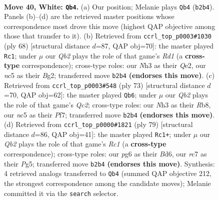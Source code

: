 \documentclass[11pt]{article}
\begin{document}
\clearpage

\begin{figure}[p]\centering
\begin{subfigure}{0.46\textwidth}\centering
\resizebox{\linewidth}{!}{%
\newchessgame
\chessboard[
  setfen={2b3k1/1qr2p1p/6p1/1Bn1Pp2/p4P2/7N/PQP2KPP/1R6 w - - 16 40},
  showmover=false,
  pgfstyle=straightmove, color=movearrow, markmove={b2-b4}
]}
\caption{}
\end{subfigure}\hfill
\begin{subfigure}{0.46\textwidth}\centering
\resizebox{\linewidth}{!}{%
\newchessgame
\chessboard[
  setfen={3q2k1/1p3ppb/p1pr3p/4n2P/1P1N4/P3P1P1/4QPB1/3R2K1 w - - 5 35},
  showmover=false,
  pgfstyle=straightmove, color=movearrow, markmove={d1-c1}
]}
\caption{}
\end{subfigure}
\\[4pt]
\begin{subfigure}{0.46\textwidth}\centering
\resizebox{\linewidth}{!}{%
\newchessgame
\chessboard[
  setfen={1r4k1/2q2p2/3p1npb/p2Pp3/Q3P2B/2P4P/R3NPPK/8 b - - 0 37},
  showmover=false,
  pgfstyle=straightmove, color=movearrow, markmove={c7-b6}
]}
\caption{}
\end{subfigure}\hfill
\begin{subfigure}{0.46\textwidth}\centering
\resizebox{\linewidth}{!}{%
\newchessgame
\chessboard[
  setfen={2r1b2k/8/1p1bpq2/5pp1/p2N4/P3P1P1/1P1RQPB1/6K1 b - - 0 40},
  showmover=false,
  pgfstyle=straightmove, color=movearrow, markmove={c8-c1}
]}
\caption{}
\end{subfigure}
\caption{\textbf{Move 40, White: \texttt{Qb4}.} (a) Our position; Melanie plays \texttt{Qb4} (\texttt{b2b4}). Panels (b)--(d) are the retrieved master positions whose correspondence most drove this move (highest QAP objective among those that transfer to it). (b) Retrieved from \texttt{ccrl\_top\_p0003\#1030} (ply 68) [structural distance $d$=87, QAP obj=70]: the master played \texttt{Rc1}; under $\mu$ our \emph{Qb2} plays the role of that game's \emph{Rd1} (a \textbf{cross-type} correspondence); cross-type roles: our \emph{N}h3 as their \emph{Q}e2, our \emph{n}c5 as their \emph{B}g2; transferred move \texttt{b2b4} \textbf{(endorses this move)}. (c) Retrieved from \texttt{ccrl\_top\_p0003\#548} (ply 73) [structural distance $d$=70, QAP obj=62]: the master played \texttt{Qb6}; under $\mu$ our \emph{Qb2} plays the role of that game's \emph{Qc2}; cross-type roles: our \emph{N}h3 as their \emph{R}b8, our \emph{n}c5 as their \emph{P}f7; transferred move \texttt{b2b4} \textbf{(endorses this move)}. (d) Retrieved from \texttt{ccrl\_top\_p0000\#1821} (ply 79) [structural distance $d$=86, QAP obj=41]: the master played \texttt{Rc1+}; under $\mu$ our \emph{Qb2} plays the role of that game's \emph{Rc1} (a \textbf{cross-type} correspondence); cross-type roles: our \emph{p}g6 as their \emph{B}d6, our \emph{r}c7 as their \emph{P}g5; transferred move \texttt{b2b4} \textbf{(endorses this move)}. Synthesis: 4 retrieved analogs transferred to \texttt{Qb4} (summed QAP objective 212, the strongest correspondence among the candidate moves); Melanie committed it via the \texttt{search} selector.}
\label{fig:thought-m78}
\end{figure}
\end{document}
